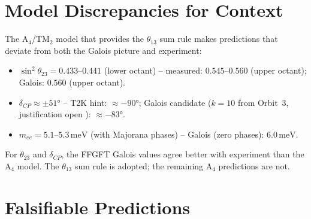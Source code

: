 \section{Model Discrepancies for Context \SM}

The A$_4$/TM$_2$ model \cite{Razzaghi2022} that provides the
$\theta_{13}$ sum rule makes predictions that deviate from both
the Galois picture and experiment:
\begin{itemize}
\item $\sin^2\theta_{23}=0.433$--$0.441$ (lower octant) --
  measured: $0.545$--$0.560$ (upper octant); Galois: $0.560$ (upper octant).
\item $\delta_{CP}\approx\pm51°$ --
  T2K hint: $\approx-90°$; Galois candidate ($k=10$ from Orbit~3,
  justification open \SM): $\approx-83°$.
\item $m_{ee}=5.1$--$5.3\,\text{meV}$ (with Majorana phases) --
  Galois (zero phases): $6.0\,\text{meV}$.
\end{itemize}
For $\theta_{23}$ and $\delta_{CP}$, the FFGFT Galois values
agree better with experiment than the A$_4$ model.
The $\theta_{13}$ sum rule is adopted; the remaining A$_4$
predictions are not.

\section{Falsifiable Predictions}

